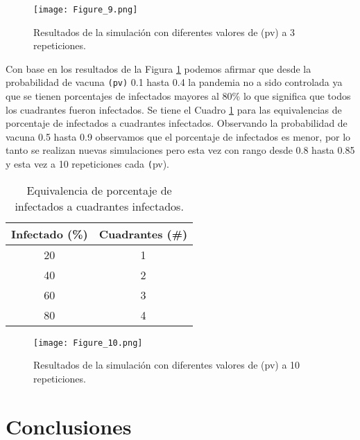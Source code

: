 \documentclass[final,6p,times,twocolumn]{elsarticle}
\begin{document}
\begin{figure}
\label{fig:F9}
\centering
\texttt{[image: Figure\_9.png]}
\caption{Resultados de la simulación con diferentes valores de (pv) a 3 repeticiones.}
\end{figure} 

Con base en los resultados de la Figura \ref{fig:F9} podemos afirmar que desde la probabilidad de vacuna \texttt{(pv)} 0.1 hasta 0.4 la pandemia no a sido controlada ya que se tienen porcentajes de infectados mayores al 80\% lo que significa que todos los cuadrantes fueron infectados. Se tiene el Cuadro \ref{E.cuadro} para las equivalencias de porcentaje de infectados a cuadrantes infectados. Observando la probabilidad de vacuna 0.5 hasta 0.9 observamos que el porcentaje de infectados es menor, por lo tanto se realizan nuevas simulaciones pero esta vez con rango desde 0.8 hasta 0.85 y esta vez a 10 repeticiones cada \texttt(pv).

\begin{table}
\centering
\label{E.cuadro}
\caption{Equivalencia de porcentaje de infectados a cuadrantes infectados.}
\begin{tabular}{|c|c|}
\hline 
 Infectado (\%) & Cuadrantes (\#) \\ 
\hline 
20 & 1 \\ 
\hline 
40 & 2 \\ 
\hline 
60 & 3 \\ 
\hline 
80 & 4 \\ 
\hline 
\end{tabular} 
\end{table}


\begin{figure}
\label{fig:F10}
\centering
\texttt{[image: Figure\_10.png]}
\caption{Resultados de la simulación con diferentes valores de (pv) a 10 repeticiones.}
\end{figure} 



\section{Conclusiones}
\end{document}
